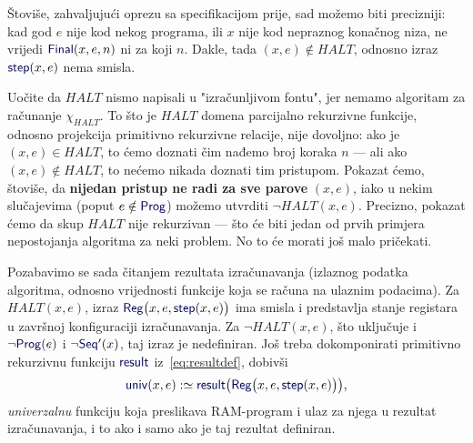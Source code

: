 \begin{napomena}[{name=[totalna specifikacija zaustavljanja izračunavanja]}]\label{nap:HaltProg}
Štoviše, zahvaljujući oprezu sa specifikacijom prije, sad možemo biti precizniji: kad god $e$ nije kod nekog programa, ili $x$ nije kod nepraznog konačnog niza, ne vrijedi $\f{Final}(x,e,n)$ ni za koji $n$. Dakle, tada $(x,e)\notin HALT$, odnosno izraz $\f{step}(x,e)$ nema smisla.
\end{napomena}

Uočite da $HALT$ nismo napisali u "izračunljivom fontu", jer nemamo algoritam za računanje $\chi_{HALT}$. To što je $HALT$ domena parcijalno rekurzivne funkcije, odnosno projekcija primitivno rekurzivne relacije, nije dovoljno: ako je $(x,e)\in HALT$, to ćemo doznati čim nađemo broj koraka $n$ --- ali ako $(x,e)\notin HALT$, to nećemo nikada doznati tim pristupom. Pokazat ćemo, štoviše, da \textbf{nijedan pristup ne radi za sve parove} $(x,e)$, iako u nekim slučajevima (poput $e\notin\f{Prog}$) možemo utvrditi $\lnot HALT(x,e)$. Precizno, pokazat ćemo da skup $HALT$ nije rekurzivan --- što će biti jedan od prvih primjera nepostojanja algoritma za neki problem. No to će morati još malo pričekati.

Pozabavimo se sada čitanjem rezultata izračunavanja (izlaznog podatka algoritma, odnosno vrijednosti funkcije koja se računa na ulaznim podacima). Za $HALT(x,e)$, izraz $\f{Reg}\bigl(x,e,\f{step}(x,e)\bigr)$ ima smisla i predstavlja stanje registara u završnoj konfiguraciji izračunavanja. Za $\lnot HALT(x,e)$, što uključuje i $\lnot\f{Prog}(e)$ i $\lnot\f{Seq}'(x)$, taj izraz je nedefiniran. Još treba dokomponirati primitivno rekurzivnu funkciju $\f{result}$ iz~\eqref{eq:resultdef}, dobivši
\begin{equation}
\label{eq:univdef}\f{univ}(x,e):\simeq\f{result}\bigl(\f{Reg}\bigl(x,e,\f{step}(x,e)\bigr)\bigr)\text,
\end{equation}
\emph{univerzalnu} funkciju koja preslikava RAM-program i ulaz za njega u rezultat iz\-ra\-ču\-na\-va\-nja, i to ako i samo ako je taj rezultat definiran.

